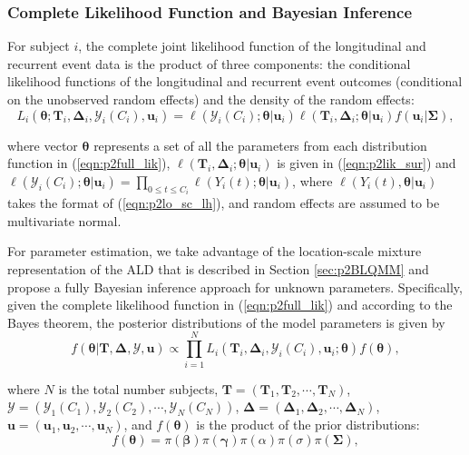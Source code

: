 \subsubsection{Complete Likelihood Function and Bayesian Inference}\label{sec:p2estimation}
For subject $i$, the complete joint likelihood function of the longitudinal and recurrent event data is the product of three components: the conditional likelihood functions of the longitudinal and recurrent event outcomes (conditional on the unobserved random effects) and the density of the random effects:
\begin{equation}\label{eqn:p2full_lik}
L_i(\boldsymbol{\theta};{\boldsymbol T}_i, \boldsymbol{\Delta}_i, \mathcal{Y}_{i}(C_i), \boldsymbol{u}_i) = \ell(\mathcal{Y}_{i}(C_i); \boldsymbol{\theta}|\boldsymbol{u}_i)\ell({\boldsymbol T}_i, {\boldsymbol\Delta}_i; \boldsymbol{\theta}|\boldsymbol{u}_i)f(\boldsymbol{u}_i|\boldsymbol{\Sigma}),
\end{equation}

\noindent where vector $\boldsymbol{\theta}$ represents a set of all the parameters from each distribution function in (\ref{eqn:p2full_lik}),  $\ell(\boldsymbol{T}_i, \boldsymbol{\Delta}_i; \boldsymbol{\theta}|\boldsymbol{u}_i)$ is given in (\ref{eqn:p2lik_sur}) and $\ell(\mathcal{Y}_{i}(C_i); \boldsymbol{\theta}|\boldsymbol{u}_i)=\prod_{0\le t\le C_i}\ell(Y_{i}(t); \boldsymbol{\theta}|\boldsymbol{u}_i)$, where $\ell(Y_{i}(t), \boldsymbol{\theta}|\boldsymbol{u}_i)$ takes the format of (\ref{eqn:p2lo_sc_lh}), and random effects are assumed to be multivariate normal.

For parameter estimation, we take advantage of the location-scale mixture representation of the ALD that is described in Section \ref{sec:p2BLQMM} and propose a fully Bayesian inference approach for unknown parameters. Specifically, given the complete likelihood function in (\ref{eqn:p2full_lik}) and according to the Bayes theorem, the posterior distributions of the model parameters is given by
\begin{equation}\label{eqn:p2posterior}
f(\boldsymbol{\theta}|\boldsymbol{T}, \boldsymbol{\Delta}, \bm{\mathcal{Y}}, \boldsymbol{u})\propto \prod_{i=1}^N L_i(\boldsymbol{T}_i, \boldsymbol{\Delta}_i, \mathcal{Y}_{i}(C_i), \boldsymbol{u}_i;\boldsymbol{\theta}) f(\boldsymbol{\theta}),
\end{equation}

\noindent where $N$ is the total number subjects, $\boldsymbol{T}=(\boldsymbol{T}_1, \boldsymbol{T}_2, \cdots, \boldsymbol{T}_N)$, $\bm{\mathcal{Y}}=(\mathcal{Y}_{1}(C_1), \mathcal{Y}_{2}(C_2), \cdots, \mathcal{Y}_{N}(C_N))$, $\boldsymbol{\Delta} =(\boldsymbol{\Delta}_1, \boldsymbol{\Delta}_2, \cdots, \boldsymbol{\Delta}_N)$, $\boldsymbol{u}=(\boldsymbol{u}_1, \boldsymbol{u}_2, \cdots, \boldsymbol{u}_N)$, and $f(\boldsymbol{\theta})$ is the product of the prior distributions:
\[f(\boldsymbol{\theta})=\pi(\boldsymbol{\beta})\pi(\boldsymbol{\gamma})\pi(\alpha)\pi(\sigma)\pi(\boldsymbol{\Sigma}),\]


